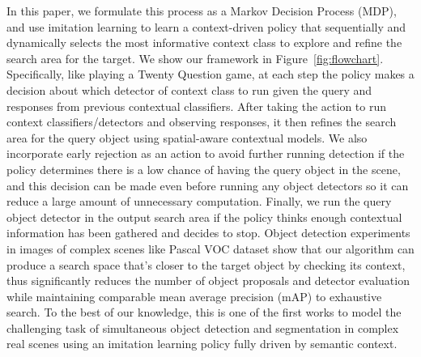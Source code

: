 In this paper, we formulate this process as a Markov Decision Process (MDP), and use imitation learning to learn a context-driven policy that sequentially and dynamically selects the most informative context class to explore and refine the search area for the target. We show our framework in Figure~\ref{fig:flowchart}.  Specifically, like playing a Twenty Question game, at each step the policy makes a decision about which detector of context class to run given the query and responses from previous contextual classifiers. After taking the action to run context classifiers/detectors and observing responses, it then refines the search area for the query object using spatial-aware contextual models. We also incorporate early rejection as an action to avoid further running detection if the policy determines there is a low chance of having the query object in the scene, and this decision can be made even before running any object detectors so it can reduce a large amount of unnecessary computation. Finally, we run the query object detector in the output search area if the policy thinks enough contextual information has been gathered and decides to stop. Object detection experiments in images of complex scenes like Pascal VOC dataset show that our algorithm can produce a search space that's closer to the target object by checking its context, thus significantly reduces the number of object proposals and detector evaluation while maintaining comparable mean average precision (mAP) to exhaustive search. To the best of our knowledge, this is one of the first works to model the challenging task of simultaneous object detection and segmentation in complex real scenes using an imitation learning policy fully driven by semantic context.

